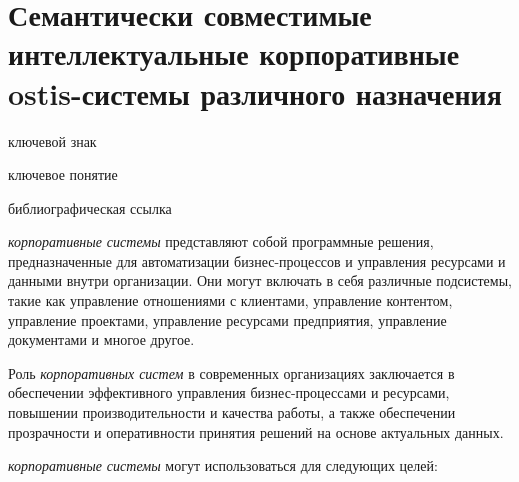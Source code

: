 \section{Семантически совместимые интеллектуальные корпоративные ostis-системы различного назначения}
{\label{sec_corporate_ostis_system}} 

\begin{SCn}

\begin{scnrelfromlist}{ключевой знак}
\end{scnrelfromlist}

\begin{scnrelfromlist}{ключевое понятие}
\end{scnrelfromlist}

\bigskip

\begin{scnrelfromlist}{библиографическая ссылка}
\end{scnrelfromlist}

\end{SCn}

\textit{корпоративные системы} представляют собой программные решения, предназначенные для автоматизации бизнес-процессов и управления ресурсами и данными внутри организации. Они могут включать в себя различные подсистемы, такие как управление отношениями с клиентами, управление контентом, управление проектами, управление ресурсами предприятия, управление документами и многое другое.

Роль \textit{корпоративных систем} в современных организациях заключается в обеспечении эффективного управления бизнес-процессами и ресурсами, повышении производительности и качества работы, а также обеспечении прозрачности и оперативности принятия решений на основе актуальных данных.

\textit{корпоративные системы} могут использоваться для следующих целей:

